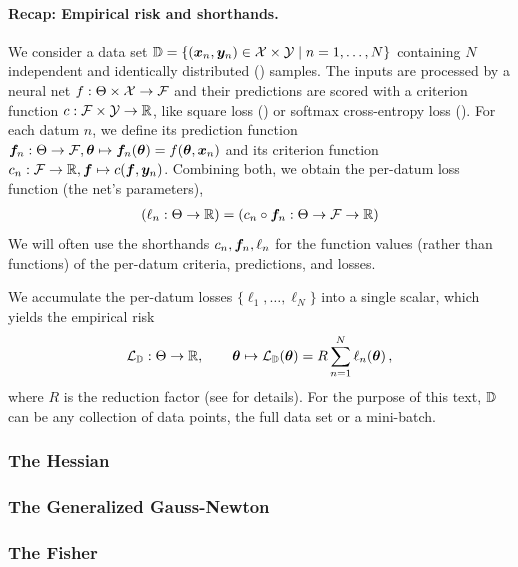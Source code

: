 \paragraph{Recap: Empirical risk and shorthands.}
We consider a data set ${\mathbb{D}} = \{({\bm{x}}_n, {\bm{y}}_n) \in {\mathcal{X}} \times {\mathcal{Y}} \mid n = 1, \dots, N \}$ containing $N$ independent and identically distributed (\iid) samples.
The inputs are processed by a neural net $f: \Theta \times {\mathcal{X}} \to {\mathcal{F}}$ and their predictions are scored with a criterion function $c: {\mathcal{F}} \times {\mathcal{Y}} \to {\mathbb{R}}$, like square loss () or softmax cross-entropy loss ().
For each datum $n$, we define its prediction function ${\bm{f}}_n: \Theta \to {\mathcal{F}}, {\bm{\theta}} \mapsto {\bm{f}}_n({\bm{\theta}}) = f({\bm{\theta}}, {\bm{x}}_n)$ and its criterion function $c_n: {\mathcal{F}} \to {\mathbb{R}}, {\bm{f}} \mapsto c({\bm{f}}, {\bm{y}}_n)$.
Combining both, we obtain the per-datum loss function (\wrt the net's parameters),
\begin{align*}
  (\ell_n: \Theta \to {\mathbb{R}}) = (c_n \circ {\bm{f}}_n: \Theta \to {\mathcal{F}} \to {\mathbb{R}})
\end{align*}
We will often use the shorthands $c_n, {\bm{f}}_n, \ell_n$ for the function values (rather than functions) of the per-datum criteria, predictions, and losses.

We accumulate the per-datum losses $\{\ell_1, \dots, \ell_N\}$ into a single scalar, which yields the empirical risk
\begin{align*}
  {\mathcal{L}}_{{\mathbb{D}}}: \Theta \to {\mathbb{R}},
  \qquad
  {\bm{\theta}} \mapsto {\mathcal{L}}_{{\mathbb{D}}}({\bm{\theta}}) = R \sum_{n=1}^N \ell_n({\bm{\theta}})\,,
\end{align*}
where $R$ is the reduction factor (see  for details).
For the purpose of this text, ${\mathbb{D}}$ can be any collection of data points, \eg the full data set or a mini-batch.

\subsubsection{The Hessian}\label{sec:basics_dl_hessian}


\subsubsection{The Generalized Gauss-Newton}


\subsubsection{The Fisher}\label{sec:fisher}


